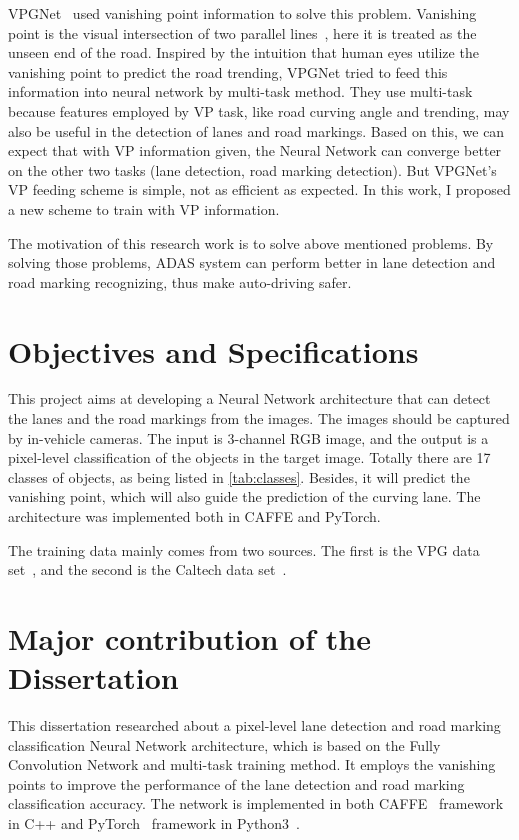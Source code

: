 \begin{spacing}{1.5}
VPGNet~\cite{lee2017vpgnet} used vanishing point information to solve this problem. Vanishing point is the visual intersection of two parallel lines~\cite{barnard1983interpreting}, here it is treated as the unseen end of the road.  Inspired by the intuition that human eyes utilize the vanishing point to predict the road trending, VPGNet tried to feed this information into neural network by multi-task method. They use multi-task because features employed by VP task, like road curving angle and trending, may also be useful in the detection of lanes and road markings. Based on this, we can expect that with VP information given, the Neural Network can converge better on the other two tasks (lane detection, road marking detection). But VPGNet’s VP feeding scheme is simple, not as efficient as expected. In this work, I proposed a new scheme to train with VP information.

The motivation of this research work is to solve above mentioned problems. By solving those problems, ADAS system can perform better in lane detection and road marking recognizing, thus make auto-driving safer.

\section{Objectives and Specifications}
\label{sec:IN_objectives}

This project aims at developing a Neural Network architecture that can detect the lanes and the road markings from the images. The images should be captured by in-vehicle cameras. The input is 3-channel RGB image, and the output is a pixel-level classification of the objects in the target image. Totally there are 17 classes of objects, as being listed in \autoref{tab:classes}. Besides, it will predict the vanishing point, which will also guide the prediction of the curving lane. The architecture was implemented both in CAFFE and PyTorch.

The training data mainly comes from two sources. The first is the VPG data set~\cite{lee2017vpgnet}, and the second is the Caltech data set~\cite{aly2008real}.

\section{Major contribution of the Dissertation}
\label{sec:IN_contribution}

This dissertation researched about a pixel-level lane detection and road marking classification Neural Network architecture, which is based on the Fully Convolution Network and multi-task training method. It employs the vanishing points to improve the performance of the lane detection and road marking classification accuracy. The network is implemented in both CAFFE~\cite{jia2014caffe} framework in C++ and PyTorch~\cite{NEURIPS2019_9015} framework in Python3~\cite{python3}.


\end{spacing}
